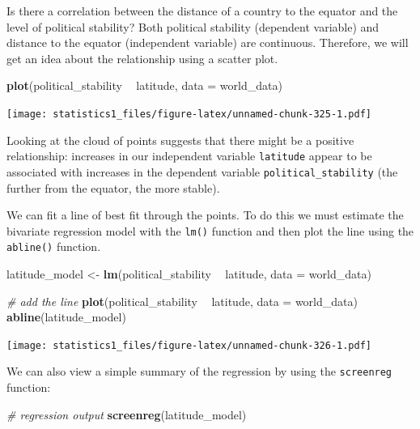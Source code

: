 \documentclass[]{article}
\newenvironment{Shaded}{\begin{snugshade}}{\end{snugshade}}
\newcommand{\KeywordTok}[1]{\textcolor[rgb]{0.13,0.29,0.53}{\textbf{#1}}}
\newcommand{\DataTypeTok}[1]{\textcolor[rgb]{0.13,0.29,0.53}{#1}}
\newcommand{\StringTok}[1]{\textcolor[rgb]{0.31,0.60,0.02}{#1}}
\newcommand{\CommentTok}[1]{\textcolor[rgb]{0.56,0.35,0.01}{\textit{#1}}}
\newcommand{\OperatorTok}[1]{\textcolor[rgb]{0.81,0.36,0.00}{\textbf{#1}}}
\newcommand{\NormalTok}[1]{#1}
\theoremstyle{definition}
\theoremstyle{definition}
\theoremstyle{definition}
\theoremstyle{remark}
\begin{document}
Is there a correlation between the distance of a country to the equator
and the level of political stability? Both political stability
(dependent variable) and distance to the equator (independent variable)
are continuous. Therefore, we will get an idea about the relationship
using a scatter plot.

\begin{Shaded}
\begin{Highlighting}[]
\KeywordTok{plot}\NormalTok{(political_stability }\OperatorTok{~}\StringTok{ }\NormalTok{latitude, }\DataTypeTok{data =}\NormalTok{ world_data)}
\end{Highlighting}
\end{Shaded}

\texttt{[image: statistics1\_files/figure-latex/unnamed-chunk-325-1.pdf]}

Looking at the cloud of points suggests that there might be a positive
relationship: increases in our independent variable \texttt{latitude}
appear to be associated with increases in the dependent variable
\texttt{political\_stability} (the further from the equator, the more
stable).

We can fit a line of best fit through the points. To do this we must
estimate the bivariate regression model with the \texttt{lm()} function
and then plot the line using the \texttt{abline()} function.

\begin{Shaded}
\begin{Highlighting}[]
\NormalTok{latitude_model <-}\StringTok{ }\KeywordTok{lm}\NormalTok{(political_stability }\OperatorTok{~}\StringTok{ }\NormalTok{latitude, }\DataTypeTok{data =}\NormalTok{ world_data)}

\CommentTok{# add the line}
\KeywordTok{plot}\NormalTok{(political_stability }\OperatorTok{~}\StringTok{ }\NormalTok{latitude, }\DataTypeTok{data =}\NormalTok{ world_data)}
\KeywordTok{abline}\NormalTok{(latitude_model)}
\end{Highlighting}
\end{Shaded}

\texttt{[image: statistics1\_files/figure-latex/unnamed-chunk-326-1.pdf]}

We can also view a simple summary of the regression by using the
\texttt{screenreg} function:

\begin{Shaded}
\begin{Highlighting}[]
\CommentTok{# regression output}
\KeywordTok{screenreg}\NormalTok{(latitude_model)}
\end{Highlighting}
\end{Shaded}
\end{document}
